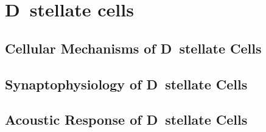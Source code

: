 \section{D~stellate cells}


\citep{SmithMassieEtAl:2005}



\subsection{Cellular Mechanisms of D~stellate Cells}


\subsection{Synaptophysiology of D~stellate Cells}


\subsection{Acoustic Response of D~stellate  Cells}







